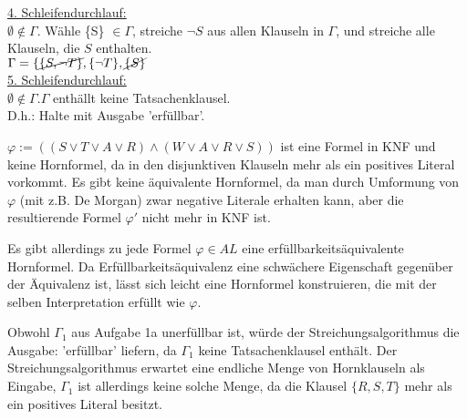 \documentclass[a4paper,10pt]{article}
\begin{document}
\begin{compactenum} [(a)]
		\underline{4. Schleifendurchlauf: }\\
		$ \emptyset \not\in \Gamma. $ Wähle \{S\} $ \in \Gamma $, streiche $ \lnot S $ aus allen Klauseln in $ \Gamma $, und streiche alle Klauseln, die $ S $ enthalten.\\
		$ \Gamma = \{\cancel{\{S,\lnot T\}}, \{\lnot T\}, \cancel{\{S\}}$\\
		
		\underline{5. Schleifendurchlauf: }\\
		$ \emptyset \not\in \Gamma. \Gamma $ enthällt keine Tatsachenklausel.\\
		D.h.: Halte mit Ausgabe 'erfüllbar'.\\
		
		\item \begin{compactenum} [(i)]
			\item $ \varphi := ((S\vee T\vee A \vee R)\wedge (W\vee A \vee R\vee S)) $ ist eine Formel in KNF und keine Hornformel, da in den disjunktiven Klauseln mehr als ein positives Literal vorkommt. Es gibt keine äquivalente Hornformel, da man durch Umformung von $ \varphi $ (mit z.B. De Morgan) zwar negative Literale erhalten kann, aber die resultierende Formel $ \varphi' $ nicht mehr in KNF ist. 
			\item Es gibt allerdings zu jede Formel $\varphi \in AL $ eine erfüllbarkeitsäquivalente Hornformel. Da Erfüllbarkeitsäquivalenz eine schwächere Eigenschaft gegenüber der Äquivalenz ist, lässt sich leicht eine Hornformel konstruieren, die mit der selben Interpretation erfüllt wie $ \varphi $.
		\end{compactenum}
		
		\item Obwohl $ \Gamma_1 $ aus Aufgabe 1a unerfüllbar ist, würde der Streichungsalgorithmus die Ausgabe: 'erfüllbar' liefern, da $ \Gamma_1 $ keine Tatsachenklausel enthält. Der Streichungsalgorithmus erwartet eine endliche Menge von Hornklauseln als Eingabe, $ \Gamma_1 $ ist allerdings keine solche Menge, da die Klausel $ \{R,S,T\} $ mehr als ein positives Literal besitzt. 
	\end{compactenum}\ \\
\end{document}
